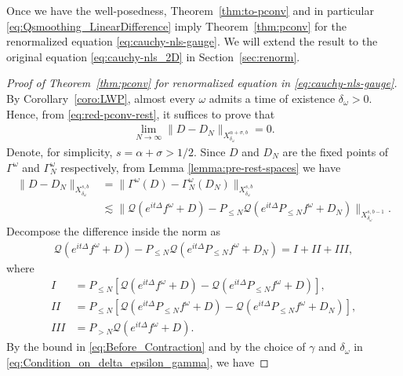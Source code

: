 \documentclass[11pt, xcolor = dvipsnames,reqno
]{amsart}
\theoremstyle{definition}
\theoremstyle{remark}
\begin{document}
Once we have the well-posedness,
Theorem~\ref{thm:to-pconv} and in particular \eqref{eq:Qsmoothing_LinearDifference} imply Theorem~\ref{thm:pconv} for the renormalized equation \eqref{eq:cauchy-nls-gauge}. 
We will extend the result to the original equation \eqref{eq:cauchy-nls_2D} in Section~\ref{sec:renorm}. 

\begin{proof}[Proof of Theorem~\ref{thm:pconv} for renormalized equation in \eqref{eq:cauchy-nls-gauge}]
By Corollary~\ref{coro:LWP}, almost every $\omega$ admits a time of existence $\delta_{\omega}>0$.
Hence, from \eqref{eq:red-pconv-rest}, it suffices to prove that 
    \begin{align}\label{eq:Final_Convergence_Property}
        \lim_{N \rightarrow \infty} \| D  - D_N \|_{X^{\alpha + \sigma, b}_{\delta_\omega}}  = 0.
    \end{align}
Denote, for simplicity, $s = \alpha + \sigma > 1/2$. 
Since $D$ and $D_N$ are the fixed points of $\Gamma^\omega$ and $\Gamma^\omega_N$ respectively, from Lemma \ref{lemma:pre-rest-spaces} we have
    \begin{align}\label{eq:Before_Absortion}
        \|  D - D_N \|_{X^{s,b}_{\delta_{\omega}}} 
        & 
        = \|  \Gamma^\omega(D) -  \Gamma^\omega_N(D_N) \|_{X^{s,b}_{\delta_{\omega}}} \\
        & \lesssim 
        \big\|  \mathcal{Q}(e^{it\Delta}  f^{\omega} + D) - P_{\leq N} \mathcal{Q}(e^{it\Delta} P_{\leq N} f^{\omega} + D_N) \big\|_{X^{s,b-1}_{\delta_{\omega}}}.
    \end{align}
    Decompose the difference inside the norm as
    \begin{align}
        \mathcal{Q}(e^{it\Delta}  f^{\omega} + D) - P_{\leq N} \mathcal{Q}(e^{it\Delta} P_{\leq N} f^{\omega} + D_N) 
        = I + II + III,  
    \end{align}
    where 
    \begin{align}
        I & = P_{\leq N} \left[ \mathcal{Q}(e^{it\Delta}  f^{\omega} + D) - \mathcal{Q}(e^{it\Delta} P_{\leq N} f^{\omega} + D)  \right], \\ 
        II & = P_{\leq N} \left[ \mathcal{Q}(e^{it\Delta} P_{\leq N} f^{\omega} + D) - \mathcal{Q}(e^{it\Delta} P_{\leq N} f^{\omega} + D_N) \right],  \\
        III & = P_{> N}\mathcal{Q}(e^{it\Delta}  f^{\omega} + D). 
    \end{align}
    By the bound in \eqref{eq:Before_Contraction}
    and by the choice of $\gamma$ and $\delta_\omega$ in \eqref{eq:Condition_on_delta_epsilon_gamma},  we have 

\end{proof}
\end{document}
